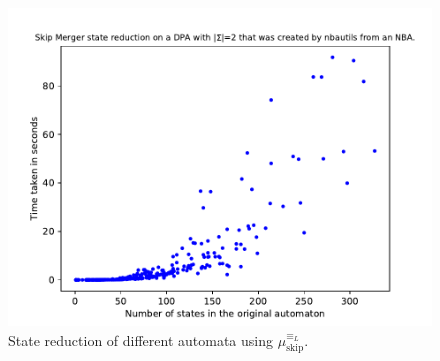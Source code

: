 \begin{figure}
\begin{minipage}{0.49\textwidth}
		\includegraphics[page=2,height=.3\textheight]{../data/analysis/skipper/detnbaut_ap1.pdf} 
		\caption{State reduction of different automata using $\mu_\text{skip}^{\equiv_L}$.}
		\label{fig:skip:empirical_reduct_abs}
	\end{minipage}
\end{figure}